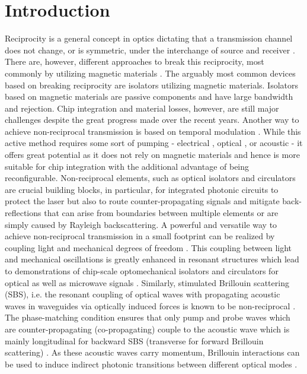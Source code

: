 \documentclass[superscriptaddress, nofootinbib, twocolumn, amsmath,amssymb, aps, pra, notitlepage, longbibliography]{revtex4-1}
\begin{document}

\section{Introduction}
%
Reciprocity is a general concept in optics dictating that a transmission channel does not change, or is symmetric, under the interchange of source and receiver \cite{Jalas2013,2017,Caloz2018}. There are, however, different approaches to break this reciprocity, most commonly by utilizing magnetic materials \cite{Shoji2008,Bi2011,Huang2017a}. The arguably most common devices based on breaking reciprocity are isolators utilizing magnetic materials. Isolators based on magnetic materials are passive components and have large bandwidth and rejection. Chip integration and material losses, however, are still major challenges despite the great progress made over the recent years. \newline
Another way to achieve non-reciprocal transmission is based on temporal modulation \cite{2017,Yu2009}. While this active method requires some sort of pumping - electrical \cite{Lira2012}, optical \cite{Kang2011}, or acoustic \cite{Sohn2018} - it offers great potential as it does not rely on magnetic materials and hence is more suitable for chip integration with the additional advantage of being reconfigurable. Non-reciprocal elements, such as optical isolators and circulators are crucial building blocks, in particular, for integrated photonic circuits to protect the laser but also to route counter-propagating signals and mitigate back-reflections that can arise from boundaries between multiple elements or are simply caused by Rayleigh backscattering. \newline
A powerful and versatile way to achieve non-reciprocal transmission in a small footprint can be realized by coupling light and mechanical degrees of freedom \cite{Verhagen2017,Miri2017}. This coupling between light and mechanical oscillations is greatly enhanced in resonant structures which lead to demonstrations of chip-scale optomechanical isolators and circulators for optical \cite{Achar2008,Verhagen2012a,Xu2015b,Ruesink2016,Shen2016,Fang2016b,Shen2018} as well as microwave signals \cite{Estep2016,Peterson2017b,Barzanjeh2017,Bernier2017}. \newline
Similarly, stimulated Brillouin scattering (SBS), i.e. the resonant coupling of optical waves with propagating acoustic waves in waveguides via optically induced forces is known to be non-reciprocal \cite{Kang2011,Huang2011}. The phase-matching condition ensures that only pump and probe waves which are counter-propagating (co-propagating) couple to the acoustic wave which is mainly longitudinal for backward SBS (transverse for forward Brillouin scattering) \cite{Eggleton2019}. As these acoustic waves carry momentum, Brillouin interactions can be used to induce indirect photonic transitions between different optical modes \cite{Kang2011,Huang2011,Poulton2012c}. \newline
\end{document}
